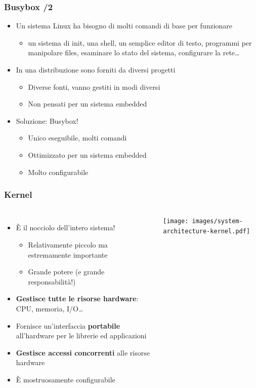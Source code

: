 \documentclass[xetex,table]{beamer}
\begin{document}
\begin{frame}
\frametitle{Busybox /2}
  \begin{itemize}
    \item Un sistema Linux ha bisogno di molti comandi di base per
      funzionare
      \begin{itemize}
        \item un sistema di init, una shell, un semplice editor di
          testo, programmi per manipolare files, esaminare lo stato
          del sistema, configurare la rete\ldots
      \end{itemize}
    \item In una distribuzione sono forniti da diversi progetti
      \begin{itemize}
        \item Diverse fonti, vanno gestiti in modi diversi
        \item Non pensati per un sistema embedded
      \end{itemize}
    \item Soluzione: Busybox!
      \begin{itemize}
        \item Unico eseguibile, molti comandi
        \item Ottimizzato per un sistema embedded
        \item Molto configurabile
      \end{itemize}
  \end{itemize}
\end{frame}

\begin{frame}
\frametitle{Kernel}
  \begin{columns}
    \begin{itemize}
      \item È il nocciolo dell'intero sistema!
      \begin{itemize}
        \item Relativamente piccolo ma estremamente importante
        \item Grande potere (e grande responsabilità!)
      \end{itemize}
      \item {\bf Gestisce tutte le risorse hardware}: CPU, memoria, I/O\ldots
      \item Fornisce un'interfaccia {\bf portabile} all'hardware per le
        librerie ed applicazioni
      \item {\bf Gestisce accessi concorrenti} alle risorse hardware
      \item È mostruosamente configurabile
    \end{itemize}
    \texttt{[image: images/system-architecture-kernel.pdf]}
  \end{columns}
\end{frame}
\end{document}
